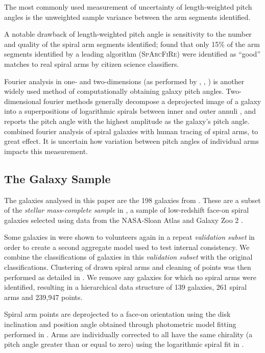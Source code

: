 The most commonly used measurement of uncertainty of length-weighted pitch angles is the unweighted sample variance between the arm segments identified.

A notable drawback of length-weighted pitch angle is sensitivity to the number and quality of the spiral arm segments identified; \citet{2017MNRAS.472.2263H} found that only 15\% of the arm segments identified by a leading algorithm (\textsc{SpArcFiRe}) were identified as ``good'' matches to real spiral arms by citizen science classifiers.

Fourier analysis in one- and two-dimensions (as performed by \citealt{2019arXiv190804246D}, \citealt{2012ApJS..199...33D}, \citealt{2018MNRAS.474.2594M}) is another widely used method of computationally obtaining galaxy pitch angles. Two-dimensional fourier methods generally decompose a deprojected image of a galaxy into a superpositions of logarithmic spirals between inner and outer annuli \citep{2012ApJS..199...33D}, and reports the pitch angle with the highest amplitude as the galaxy's pitch angle. \citet{2020MNRAS.493.3854H} combined fourier analysis of spiral galaxies with human tracing of spiral arms, to great effect. It is uncertain how variation between pitch angles of individual arms impacts this measurement.

\subsection{The Galaxy Sample}
The galaxies analysed in this paper are the 198 galaxies from \Lingard. These are a subset of the \textit{stellar mass-complete sample} in \citet{2017MNRAS.472.2263H}, a sample of low-redshift face-on spiral galaxies selected using data from the NASA-Sloan Atlas \citep{2011AJ....142...31B} and Galaxy Zoo 2 \citep{Willett2013:1308.3496v2}.

Some galaxies in \Lingard were shown to volunteers again in a repeat \textit{validation subset} in order to create a second aggregate model used to test internal consistency. We combine the classifications of galaxies in this \textit{validation subset} with the original classifications. Clustering of drawn spiral arms and cleaning of points was then performed as detailed in \Lingard. We remove any galaxies for which no spiral arms were identified, resulting in a hierarchical data structure of 139 galaxies, 261 spiral arms and 239,947 points.

Spiral arm points are deprojected to a face-on orientation using the disk inclination and position angle obtained through photometric model fitting performed in \Lingard. Arms are individually corrected to all have the same chirality (a pitch angle greater than or equal to zero) using the logarithmic spiral fit in \Lingard.


